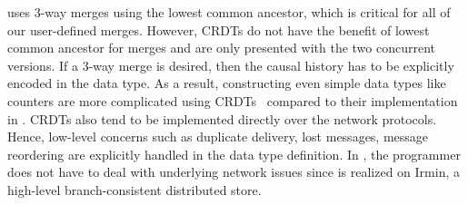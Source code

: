 \name uses 3-way merges using the lowest common ancestor, which is critical for
all of our user-defined merges. However, CRDTs do not have the benefit of
lowest common ancestor for merges and are only presented with the two
concurrent versions. If a 3-way merge is desired, then the causal history has
to be explicitly encoded in the data type. As a result, constructing even
simple data types like counters are more complicated using CRDTs~\cite{crdt}
compared to their implementation in \name. CRDTs also tend to be implemented
directly over the network protocols. Hence, low-level concerns such as
duplicate delivery, lost messages, message reordering are explicitly handled in
the data type definition. In \name, the programmer does not have to deal with
underlying network issues since \name is realized on Irmin, a high-level
branch-consistent distributed store.
